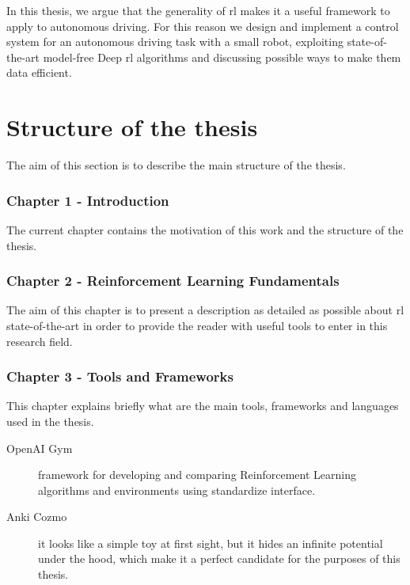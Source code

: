 In this thesis, we argue that the generality of \gls{rl} makes it a useful framework to apply to autonomous driving. 
For this reason we design and implement a control system for an autonomous driving task with a small robot, exploiting state-of-the-art model-free Deep \gls{rl} algorithms and discussing possible ways to make them data efficient.


\section{Structure of the thesis}


The aim of this section is to describe the main structure of the thesis.

\subsubsection*{Chapter 1 - Introduction} The current chapter contains the motivation of this work and the structure of the thesis.

\subsubsection*{Chapter 2 - Reinforcement Learning Fundamentals}
The aim of this chapter is to present a description as detailed as possible about \gls{rl} state-of-the-art in order to provide the reader with useful tools to enter in this research field.
\subsubsection*{Chapter 3 - Tools and Frameworks} 
This chapter explains briefly what are the main tools, frameworks and languages used in the thesis.
\begin{description}
	\item[OpenAI Gym] framework for developing and comparing Reinforcement Learning algorithms and environments using standardize interface.
	\item [Anki Cozmo] it looks like a simple toy at first sight, but it hides an infinite potential under the hood, which make it a perfect candidate for the purposes of this thesis.
\end{description}

